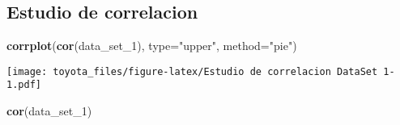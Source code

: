\documentclass[]{article}
\newenvironment{Shaded}{\begin{snugshade}}{\end{snugshade}}
\newcommand{\DataTypeTok}[1]{\textcolor[rgb]{0.13,0.29,0.53}{#1}}
\newcommand{\DecValTok}[1]{\textcolor[rgb]{0.00,0.00,0.81}{#1}}
\newcommand{\KeywordTok}[1]{\textcolor[rgb]{0.13,0.29,0.53}{\textbf{#1}}}
\newcommand{\NormalTok}[1]{#1}
\newcommand{\StringTok}[1]{\textcolor[rgb]{0.31,0.60,0.02}{#1}}
\begin{document}
\hypertarget{estudio-de-correlacion-1}{%
\subsection{Estudio de correlacion}\label{estudio-de-correlacion-1}}

\begin{Shaded}
\begin{Highlighting}[]
\KeywordTok{corrplot}\NormalTok{(}\KeywordTok{cor}\NormalTok{(data_set_}\DecValTok{1}\NormalTok{), }\DataTypeTok{type=}\StringTok{"upper"}\NormalTok{, }\DataTypeTok{method=}\StringTok{"pie"}\NormalTok{)}
\end{Highlighting}
\end{Shaded}

\texttt{[image: toyota\_files/figure-latex/Estudio de correlacion DataSet 1-1.pdf]}

\begin{Shaded}
\begin{Highlighting}[]
\KeywordTok{cor}\NormalTok{(data_set_}\DecValTok{1}\NormalTok{)}
\end{Highlighting}
\end{Shaded}
\end{document}
